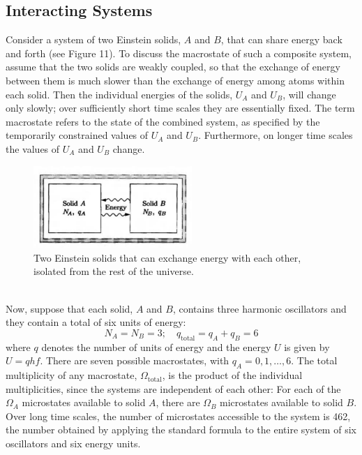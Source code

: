\documentclass[11pt]{exam}
\begin{document}
\subsection{Interacting Systems}
Consider a system of two Einstein solids, $A$ and $B$, that can share energy back and forth (see Figure 11). To discuss the macrostate of such a composite system, assume that the two solids are weakly coupled, so that the exchange of energy between them is much slower than the exchange of energy among atoms within each solid. Then the individual energies of the solids, $U_A$ and $U_B$, will change only slowly; over sufficiently short time scales they are essentially fixed. The term macrostate refers to the state of the combined system, as specified by the temporarily constrained values of $U_A$ and $U_B$. Furthermore, on longer time scales the values of $U_A$ and $U_B$ change.
\begin{figure}[htp]
    \centering
    \includegraphics[width=6cm]{figure11.png}
    \caption{Two Einstein solids that can exchange energy with each other, isolated from the rest of the universe.}
\label{fig:two-einstein-solids}
\end{figure}\\
\hspace*{10mm}Now, suppose that each solid, $A$ and $B$, contains three harmonic oscillators and they contain a total of six units of energy:
\begin{equation}\tag{2.10}
N_A = N_B = 3;\quad q_{\text{total}}=q_A+q_B=6
\end{equation}
where $q$ denotes the number of units of energy and the energy $U$ is given by $U=qhf$. There are seven possible macrostates, with $q_A=0,1,\dots,6$. The total multiplicity of any macrostate, $\Omega_{\text{total}}$, is the product of the individual multiplicities, since the systems are independent of each other: For each of the $\Omega_A$ microstates available to solid $A$, there are $\Omega_B$ microstates available to solid $B$. Over long time scales, the number of microstates accessible to the system is 462, the number obtained by applying the standard formula to the entire system of six oscillators and six energy units. \\
\end{document}
